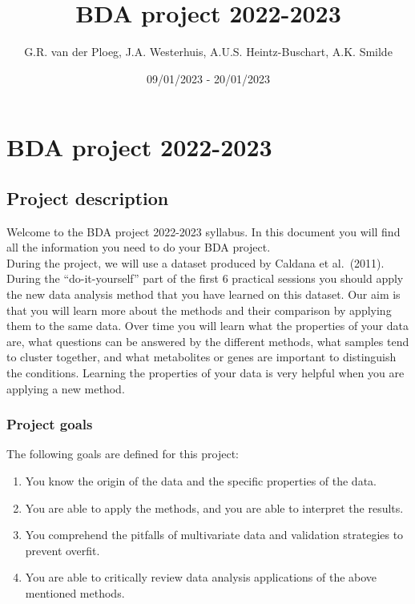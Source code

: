 \documentclass[
]{article}
\title{BDA project 2022-2023}
\author{G.R. van der Ploeg, J.A. Westerhuis, A.U.S. Heintz-Buschart,
A.K. Smilde}
\date{09/01/2023 - 20/01/2023}
\providecommand{\tightlist}{%
  \setlength{\itemsep}{0pt}\setlength{\parskip}{0pt}}
\begin{document}
\maketitle

{
\setcounter{tocdepth}{3}
\tableofcontents
}
\newpage

\hypertarget{bda-project-2022-2023}{%
\section{BDA project 2022-2023}\label{bda-project-2022-2023}}

\hypertarget{project-description}{%
\subsection{Project description}\label{project-description}}

Welcome to the BDA project 2022-2023 syllabus. In this document you will
find all the information you need to do your BDA project.\\

During the project, we will use a dataset produced by Caldana et
al.~(2011). During the ``do-it-yourself'' part of the first 6 practical
sessions you should apply the new data analysis method that you have
learned on this dataset. Our aim is that you will learn more about the
methods and their comparison by applying them to the same data. Over
time you will learn what the properties of your data are, what questions
can be answered by the different methods, what samples tend to cluster
together, and what metabolites or genes are important to distinguish the
conditions. Learning the properties of your data is very helpful when
you are applying a new method.

\hypertarget{project-goals}{%
\subsubsection{Project goals}\label{project-goals}}

The following goals are defined for this project:

\begin{enumerate}
\def\labelenumi{\arabic{enumi}.}
\tightlist
\item
  You know the origin of the data and the specific properties of the
  data.\\
\item
  You are able to apply the methods, and you are able to interpret the
  results.\\
\item
  You comprehend the pitfalls of multivariate data and validation
  strategies to prevent overfit.\\
\item
  You are able to critically review data analysis applications of the
  above mentioned methods.\\
\end{enumerate}
\end{document}
